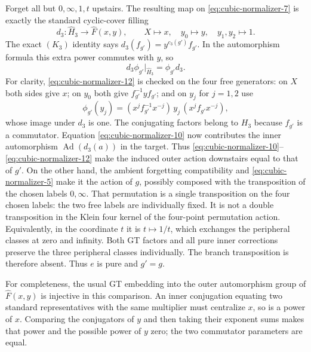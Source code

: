 Forget all but $0,\infty,1,t$ upstairs. The resulting map
on \eqref{eq:cubic-normalizer-7} is exactly the standard cyclic-cover filling
\begin{equation}\label{eq:cubic-normalizer-11}
d_3:\widehat H_3\longrightarrow\widehat F(x,y),
 \qquad X\mapsto x,\quad y_0\mapsto y,
 \quad y_1,y_2\mapsto1.
\end{equation}
The exact $(K_3)$ identity says
$d_3(f_{g'})=y^{c_3(g')}f_{g'}$. In the automorphism formula
this extra power commutes with $y$, so
\begin{equation}\label{eq:cubic-normalizer-12}
d_3\phi_{g'}|_{\widehat H_3}=\phi_{g'}d_3.
\end{equation}
For clarity, \eqref{eq:cubic-normalizer-12} is checked on the four free generators:
on $X$ both sides give $x$; on $y_0$ both give
$f_{g'}^{-1}yf_{g'}$; and on $y_j$ for $j=1,2$ use
\[
 \phi_{g'}(y_j)=(x^j f_{g'}^{-1}x^{-j})\,y_j\,
                         (x^j f_{g'}x^{-j}),
\]
whose image under $d_3$ is one. The conjugating factors
belong to $H_3$ because $f_{g'}$ is a commutator.
Equation \eqref{eq:cubic-normalizer-10} now contributes the inner automorphism
$\operatorname{Ad}(d_3(a))$ in the target. Thus
\eqref{eq:cubic-normalizer-10}--\eqref{eq:cubic-normalizer-12} make the induced outer action downstairs
equal to that of $g'$. On the other hand, the ambient
forgetting compatibility and \eqref{eq:cubic-normalizer-5} make it the action of $g$,
possibly composed with the transposition of the chosen
labels $0,\infty$. That permutation is a single transposition on the
four chosen labels: the two free labels are individually
fixed. It is not a double transposition in the Klein four
kernel of the four-point permutation action. Equivalently,
in the coordinate $t$ it is $t\mapsto1/t$, which exchanges
the peripheral classes at zero and infinity. Both GT
factors and all pure inner corrections preserve the three
peripheral classes individually. The branch transposition
is therefore absent. Thus $e$ is pure and $g'=g$.

For completeness, the usual GT embedding into the outer
automorphism group of $\widehat F(x,y)$ is injective in this
comparison. An inner conjugation equating two standard
representatives with the same multiplier must centralize
$x$, so is a power of $x$. Comparing the conjugators of
$y$ and then taking their exponent sums makes that power
and the possible power of $y$ zero; the two commutator
parameters are equal.

